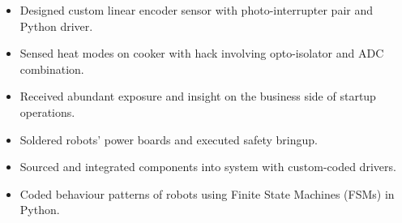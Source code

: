 \documentclass{resume}
\begin{document}
\begin{itemize}
\item Designed custom linear encoder sensor with photo-interrupter pair and Python driver.
\item Sensed heat modes on cooker with hack involving opto-isolator and ADC combination.
\item Received abundant exposure and insight on the business side of startup operations.
\end{itemize}

\begin{itemize}
\item Soldered robots' power boards and executed safety bringup.
\item Sourced and integrated components into system with custom-coded drivers.
\item Coded behaviour patterns of robots using Finite State Machines (FSMs) in Python.
\end{itemize}
\end{document}
